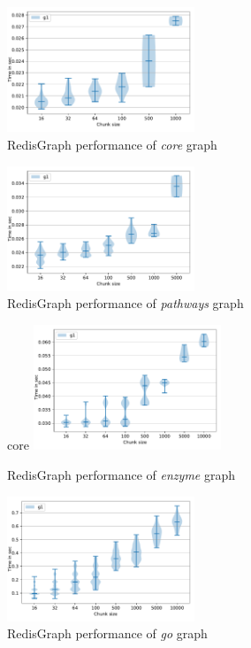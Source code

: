 \begin{figure}[h]
\centering
\includegraphics[width=0.5\textwidth]{data/raw_redis/core.pdf}
\caption{RedisGraph performance of \textit{core} graph}
\label{fig:redis_core_all}
\end{figure}


\begin{figure}[h]
\centering
\includegraphics[width=0.5\textwidth]{data/raw_redis/pathways.pdf}
\caption{RedisGraph performance of \textit{pathways} graph}
\label{fig:redis_pathways_all}
\end{figure}

\begin{figure}[h]core
\centering
\includegraphics[width=0.5\textwidth]{data/raw_redis/enzyme.pdf}
\caption{RedisGraph performance of \textit{enzyme} graph}
\label{fig:redis_enzyme_all}
\end{figure}


\begin{figure}[h]
\centering
\includegraphics[width=0.5\textwidth]{data/raw_redis/go.pdf}
\caption{RedisGraph performance of \textit{go} graph}
\label{fig:redis_go_all}
\end{figure}

